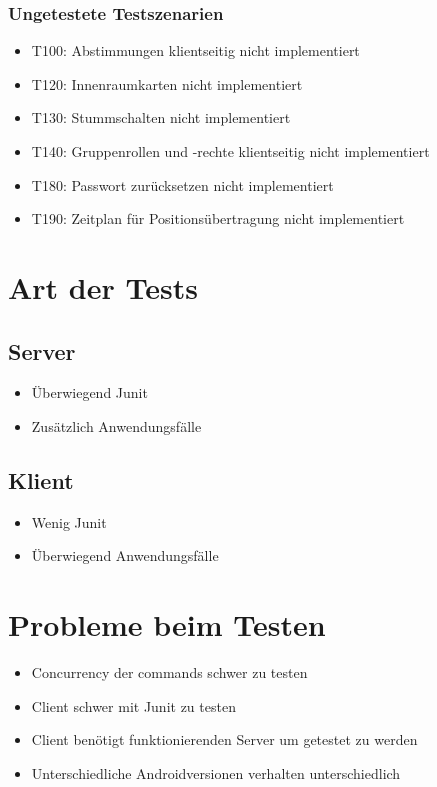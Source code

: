 \documentclass[parskip=full,11pt]{scrartcl}
\begin{document}
	\subsubsection{Ungetestete Testszenarien}
		\begin{itemize}
    	\item T100: Abstimmungen klientseitig nicht implementiert
			\item T120: Innenraumkarten nicht implementiert
			\item T130: Stummschalten nicht implementiert
			\item T140: Gruppenrollen und -rechte klientseitig nicht implementiert
			\item T180: Passwort zurücksetzen nicht implementiert
			\item T190: Zeitplan für Positionsübertragung nicht implementiert
		\end{itemize}

\section{Art der Tests}
	\subsection{Server}
		\begin{itemize}
			\item Überwiegend Junit %
			\item Zusätzlich Anwendungsfälle
		\end{itemize}

	\subsection{Klient}
		\begin{itemize}
			\item Wenig Junit %
			\item Überwiegend Anwendungsfälle
		\end{itemize}

\section{Probleme beim Testen}
	\begin{itemize}
		\item Concurrency der commands schwer zu testen
		\item Client schwer mit Junit zu testen
		\item Client benötigt funktionierenden Server um getestet zu werden
		\item Unterschiedliche Androidversionen verhalten unterschiedlich
	\end{itemize}
\end{document}
